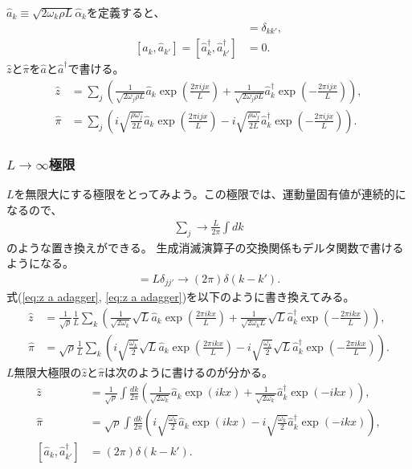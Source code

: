 \documentclass[10pt,a4paper]{jarticle}
\begin{document}
$\hat a_k \equiv \sqrt{2\omega_k \rho L} \hat\alpha_k$を定義すると、
\begin{align}
[\hat a_k, \hat a_{k'}^\dagger] &= \delta_{kk'}, \\
[\hat a_k, \hat a_{k'}] = [\hat a_k^\dagger, \hat a_{k'}^\dagger] &= 0.
\end{align}
$\hat z$と$\hat \pi$を$\hat a$と$\hat a^\dagger$で書ける。
\begin{align}
\hat z &= \sum_j \left( \frac{1}{\sqrt{2\omega_j \rho L}} \hat a_k \exp\left( \frac{2\pi ijx}{L} \right) + \frac{1}{\sqrt{2\omega_j \rho L}} \hat a_k^\dagger \exp\left( -\frac{2\pi ijx}{L} \right) \right), \label{eq:z a adagger}\\
\hat \pi &= \sum_j \left( i \sqrt{ \frac{\rho \omega_j}{2L} } \hat a_k \exp\left( \frac{2\pi ijx}{L} \right) - i \sqrt{ \frac{\rho \omega_j}{2L} } \hat a_k^\dagger \exp\left( -\frac{2\pi ijx}{L} \right) \right). \label{eq:pi a adagger}
\end{align}

\subsubsection{$L \to \infty$極限}
$L$を無限大にする極限をとってみよう。この極限では、運動量固有値が連続的になるので、
\begin{align}
\sum_j \to \frac{L}{2\pi} \int dk
\end{align}
のような置き換えができる。
%
生成消滅演算子の交換関係もデルタ関数で書けるようになる。
\begin{align}
[\sqrt{L} \hat a_j, \sqrt{L} \hat a_{j'} ] = L \delta_{jj'} \to (2\pi) \delta(k-k').
\end{align}
%
式(\ref{eq:z a adagger}, \ref{eq:z a adagger})を以下のように書き換えてみる。
\begin{align}
\hat z &= \frac{1}{\sqrt\rho} \frac{1}{L} \sum_k \left( \frac{1}{\sqrt{2\omega_k}} \sqrt{L} \hat a_k \exp\left( \frac{2\pi ikx}{L} \right) + \frac{1}{\sqrt{2\omega_k L}} \sqrt{L} \hat a_k^\dagger \exp\left( -\frac{2\pi ikx}{L} \right) \right), \\
\hat \pi &= \sqrt{\rho} \frac{1}{L} \sum_k \left( i \sqrt{ \frac{\omega_k}{2} } \sqrt{L} \hat a_k \exp\left( \frac{2\pi ikx}{L} \right) - i \sqrt{ \frac{\omega_k}{2} } \sqrt{L} \hat a_k^\dagger \exp\left( -\frac{2\pi ikx}{L} \right) \right).
\end{align}
%
$L$無限大極限の$\hat z$と$\hat \pi$は次のように書けるのが分かる。
\begin{align}
\hat z &= \frac{1}{\sqrt\rho} \int \frac{dk}{2\pi} \left( \frac{1}{\sqrt{2\omega_k}} \hat a_k \exp\left( ikx \right) + \frac{1}{\sqrt{2\omega_k}} \hat a_k^\dagger \exp\left( -ikx \right) \right), \\
\hat \pi &= \sqrt{\rho} \int \frac{dk}{2\pi} \left( i \sqrt{ \frac{\omega_k}{2} } \hat a_k \exp\left( ikx \right) - i \sqrt{ \frac{\omega_k}{2} } \hat a_k^\dagger \exp\left( -ikx \right) \right), \\
[\hat a_k, \hat a_{k'}^\dagger] &= (2\pi) \delta(k-k').
\end{align}
\end{document}
